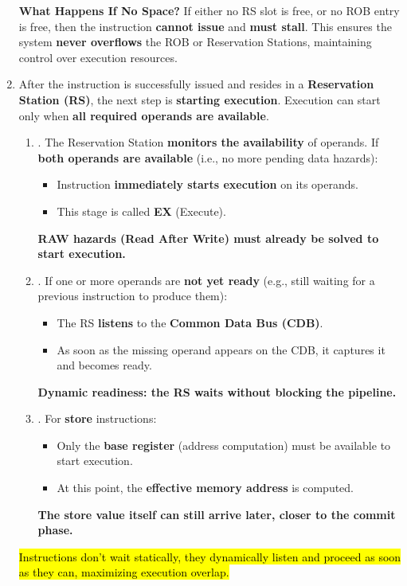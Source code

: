 \begin{enumerate}
    \textcolor{Red2}{ \textbf{What Happens If No Space?}} If either no RS slot is free, or no ROB entry is free, then the instruction \textbf{cannot issue} and \textbf{must stall}. This ensures the system \textbf{never overflows} the ROB or Reservation Stations, maintaining control over execution resources.


    \item {}
    
    After the instruction is successfully issued and resides in a \textbf{Reservation Station (RS)}, the next step is \textbf{starting execution}. Execution can start only when \textbf{all required operands are available}.
    \begin{enumerate}
        \item {}. The Reservation Station \textbf{monitors the availability} of operands. If \textbf{both operands are available} (i.e., no more pending data hazards):
        \begin{itemize}
            \item Instruction \textbf{immediately starts execution} on its operands.
            \item This stage is called \textbf{EX} (Execute).
        \end{itemize}
        \textcolor{Green3}{\faIcon{\speedIcon} \textbf{RAW hazards (Read After Write) must already be solved to start execution.}}

        \item {}. If one or more operands are \textbf{not yet ready} (e.g., still waiting for a previous instruction to produce them):
        \begin{itemize}
            \item The RS \textbf{listens} to the \textbf{Common Data Bus (CDB)}.
            \item As soon as the missing operand appears on the CDB, it captures it and becomes ready.
        \end{itemize}
        \textcolor{Green3}{\faIcon{\speedIcon} \textbf{Dynamic readiness: the RS waits without blocking the pipeline.}}

        \newpage

        \item {}. For \textbf{store} instructions:
        \begin{itemize}
            \item Only the \textbf{base register} (address computation) must be available to start execution.
            \item At this point, the \textbf{effective memory address} is computed.
        \end{itemize}
        \textcolor{Green3}{\faIcon{\speedIcon} \textbf{The store value itself can still arrive later, closer to the commit phase.}}
    \end{enumerate}
    \hl{Instructions don't wait statically, they dynamically listen and proceed as soon as they can, maximizing execution overlap.}



\end{enumerate}
